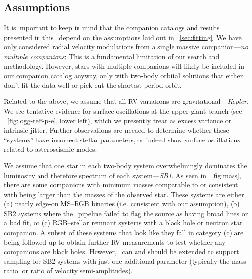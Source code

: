 \documentclass[modern, letterpaper]{aastex62}
\newcommand{\apogee}{\project{\acronym{APOGEE}}}
\newcommand{\thejoker}{\project{The~Joker}}
\begin{document}
\subsection{Assumptions}
\label{sec:discuss-assumptions}

It is important to keep in mind that the companion catalogs and results
presented in this \documentname\ depend on the assumptions laid out in
\sectionname~\ref{sec:fitting}.
We have only considered radial velocity modulations from a single massive
companion---\emph{no multiple companions}; This is a fundamental limitation of
our search and methodology.
However, stars with multiple companions will likely be included in our companion
catalog anyway, only with two-body orbital solutions that either don't fit the
data well or pick out the shortest period orbit.

Related to the above, we assume that all RV variations are
gravitational---\emph{Kepler}.
We see tentative evidence for surface oscillations at the upper giant branch
(see \figurename~\ref{fig:logg-teff-p-e}, lower left), which we presently treat
as excess variance or intrinsic jitter.
Further observations are needed to determine whether these ``systems'' have
incorrect stellar parameters, or indeed show surface oscillations related to
asteroseismic modes.

We assume that one star in each two-body system overwhelmingly dominates the
luminosity and therefore spectrum of each system---\emph{SB1}.
As seen in \figurename~\ref{fig:mass}, there are some companions with minimum
masses comparable to or consistent with being larger than the masses of the
observed star.
These systems are either (a) nearly edge-on MS--RGB binaries (i.e. consistent
with our assumption), (b) SB2 systems where the \apogee\ pipeline failed to flag
the source as having broad lines or a bad fit, or (c) RGB--stellar remnant
systems with a black hole or neutron star companion.
A subset of these systems that look like they fall in category (c) are being
followed-up to obtain further RV measurements to test whether any companions are
black holes.
However, \thejoker\ can and should be extended to support sampling for SB2
systems with just one additional parameter (typically the mass ratio, or ratio
of velocity semi-amplitudes).
\end{document}
